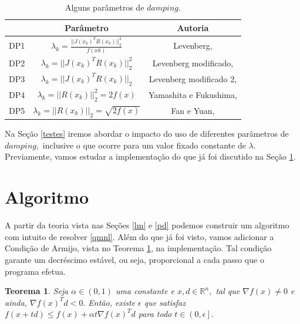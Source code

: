 \documentclass[12pt,a4paper]{article}
\newtheorem{teo}{Teorema}[section]
\newcounter{ex}[section]
\begin{document}
	\begin{table}[H]
		\centering
		\doublespacing
		\begin{doublespace}
		
		\label{tab:damp}
		\begin{tabular}{|c|c|c|}
			\hline
			&\textbf{Parâmetro} & \textbf{Autoria}  \\ \hline
			DP1\label{dp1} & $\lambda_k = \frac{||J(x_k)^T R(x_k)||^{2}_{2}}{f(xk)}$ & Levenberg, \cite{levenberg1944} \\ \hline
			DP2\label{dp2} & $\lambda_k = ||J(x_k)^T R(x_k)||^{2}_{2}$                 & Levenberg modificado, \cite{levenberg1944, benatti2017} \\ \hline
			
			DP3\label{dp3}&$\lambda_k = ||J(x_k)^T R(x_k)||_{2}$                     & Levenberg modificado 2, \cite{levenberg1944, benatti2017}  \\ \hline
			DP4\label{dp4}&$\lambda_k = ||R(x_k)||^{2}_{2} = 2f(x)$                  & Yamashita e Fukushima, \cite{yamashita2001}  \\ \hline
			DP5\label{dp5}&$\lambda_k = ||R(x_k)||_{2} = \sqrt{2f(x)}$               & Fan e Yuan, \cite{fan2001} \\ \hline
		\end{tabular}
		\caption{Alguns parâmetros de $damping.$}
	\end{doublespace}
	\end{table}
	
	Na Seção \ref{testes} iremos abordar o impacto do uso de diferentes parâmetros de $damping,$ inclusive o que ocorre para um valor fixado constante de $\lambda.$ Previamente, vamos estudar a implementação do que já foi discutido na Seção \ref{algoritmo}.
	
	\section{Algoritmo}\label{algoritmo}
	
	A partir da teoria vista nas Seções \ref{lm} e \ref{pd} podemos construir um algoritmo com intuito de resolver \ref{qmnl}. Além do que já foi visto, vamos adicionar a Condição de Armijo, vista no Teorema \ref{ca}, na implementação. Tal condição garante um decréscimo estável, ou seja, proporcional a cada passo que o programa efetua. 
	
	\begin{teo}\label{ca}
		Seja $\alpha \in (0, 1)$ uma constante e $x, d \in \mathbb{R}^n,$ tal que $\nabla f(x) \neq 0$ e ainda, $\nabla f(x)^Td<0.$ Então, existe $\epsilon$ que satisfaz $f(x+td)\leq f(x)+\alpha t\nabla f(x)^Td$ para todo $t \in \left( \left. 0, \epsilon\right] \right..$
	\end{teo}
	
\end{document}
